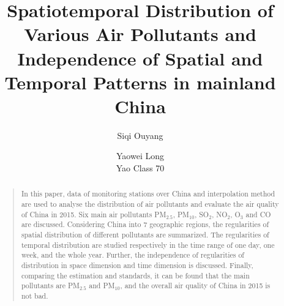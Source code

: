 \documentclass[letterpaper]{article}
\begin{document}
%
\title{Spatiotemporal Distribution of Various Air Pollutants and Independence of Spatial and Temporal Patterns in mainland China}
\author{Siqi Ouyang \and Yaowei Long \\ Yao Class 70}
\maketitle
\begin{abstract}
  \begin{quote}
    In this paper, data of monitoring stations over China and interpolation method are used to analyse the distribution of air pollutants and evaluate the air quality of China in 2015. Six main air pollutants PM$_{2.5}$, PM$_{10}$, SO$_{2}$, NO$_{2}$, O$_{3}$ and CO are discussed. Considering China into 7 geographic regions, the regularities of spatial distribution of different pollutants are summarized. The regularities of temporal distribution are studied respectively in the time range of one day, one week, and the whole year. Further, the independence of regularities of distribution in space dimension and time dimension is discussed. Finally, comparing the estimation and standards, it can be found that the main pollutants are PM$_{2.5}$ and PM$_{10}$, and the overall air quality of China in 2015 is not bad.
  \end{quote}
\end{abstract}
\end{document}
